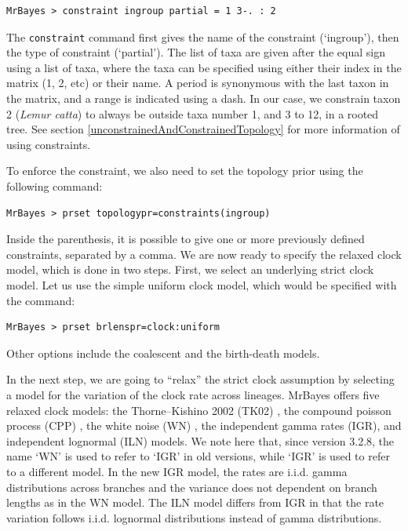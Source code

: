 \documentclass[12pt]{book}
\newcommand{\ttt}[1]{\texttt{#1}}
\begin{document}
\small
\begin{singlespacing}
\begin{verbatim}
MrBayes > constraint ingroup partial = 1 3-. : 2
\end{verbatim}
\end{singlespacing}
\normalsize

The \ttt{constraint} command first gives the name of the constraint (`ingroup'), then the type of
constraint (`partial'). The list of taxa are given after the equal sign using a list of taxa, where
the taxa can be specified using either their index in the matrix (1, 2, etc) or their name. A
period is synonymous with the last taxon in the matrix, and a range is indicated using a dash. In
our case, we constrain taxon 2 (\textit{Lemur catta}) to always be outside taxa number 1, and 3 to
12, in a rooted tree. See section \ref{unconstrainedAndConstrainedTopology} for more information of
using constraints.

To enforce the constraint, we also need to set the topology prior using the following command:

\small
\begin{singlespacing}
\begin{verbatim}
MrBayes > prset topologypr=constraints(ingroup)
\end{verbatim}
\end{singlespacing}
\normalsize

Inside the parenthesis, it is possible to give one or more previously defined constraints,
separated by a comma. We are now ready to specify the relaxed clock model, which is done in two
steps. First, we select an underlying strict clock model. Let us use the simple uniform clock
model, which would be specified with the command:

\small
\begin{singlespacing}
\begin{verbatim}
MrBayes > prset brlenspr=clock:uniform
\end{verbatim}
\end{singlespacing}
\normalsize

Other options include the coalescent and the birth-death models. 

In the next step, we are going to ``relax'' the strict clock assumption by selecting a model for the variation of the clock rate across lineages. 
MrBayes offers five relaxed clock models: the Thorne--Kishino 2002 (TK02) \citep{thorne02}, the
compound poisson process (CPP) \citep{huelsenbeck00a}, the white noise (WN) \citep{lepage07}, the independent gamma rates (IGR), and independent lognormal (ILN) \citep{drummond06} models. 
We note here that, since version 3.2.8, the name `WN' is used to refer to `IGR' in old versions, while `IGR' is used to refer to a different model. In the new IGR model, the rates are i.i.d. gamma distributions across branches and the variance does not dependent on branch lengths as in the WN model.
The ILN model differs from IGR in that the rate variation follows i.i.d. lognormal distributions instead of gamma distributions.
\end{document}
